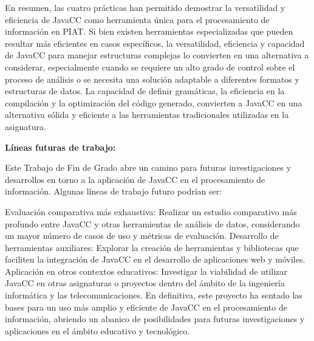En resumen, las cuatro prácticas han permitido demostrar la versatilidad y eficiencia de JavaCC como herramienta única para el procesamiento de información en PIAT. Si bien existen herramientas especializadas que pueden resultar más eficientes en casos específicos, la versatilidad, eficiencia y capacidad de JavaCC para manejar estructuras complejas lo convierten en una alternativa a considerar, especialmente cuando se requiere un alto grado de control sobre el proceso de análisis o se necesita una solución adaptable a diferentes formatos y estructuras de datos. La capacidad de definir gramáticas, la eficiencia en la compilación y la optimización del código generado, convierten a JavaCC en una alternativa sólida y eficiente a las herramientas tradicionales utilizadas en la asignatura.

\phantom{text}

\noindent \textbf{Líneas futuras de trabajo:}

\phantom{text}

Este Trabajo de Fin de Grado abre un camino para futuras investigaciones y desarrollos en torno a la aplicación de JavaCC en el procesamiento de información. Algunas líneas de trabajo futuro podrían ser:

Evaluación comparativa más exhaustiva: Realizar un estudio comparativo más profundo entre JavaCC y otras herramientas de análisis de datos, considerando un mayor número de casos de uso y métricas de evaluación.
Desarrollo de herramientas auxiliares: Explorar la creación de herramientas y bibliotecas que faciliten la integración de JavaCC en el desarrollo de aplicaciones web y móviles.
Aplicación en otros contextos educativos: Investigar la viabilidad de utilizar JavaCC en otras asignaturas o proyectos dentro del ámbito de la ingeniería informática y las telecomunicaciones.
En definitiva, este proyecto ha sentado las bases para un uso más amplio y eficiente de JavaCC en el procesamiento de información, abriendo un abanico de posibilidades para futuras investigaciones y aplicaciones en el ámbito educativo y tecnológico.
